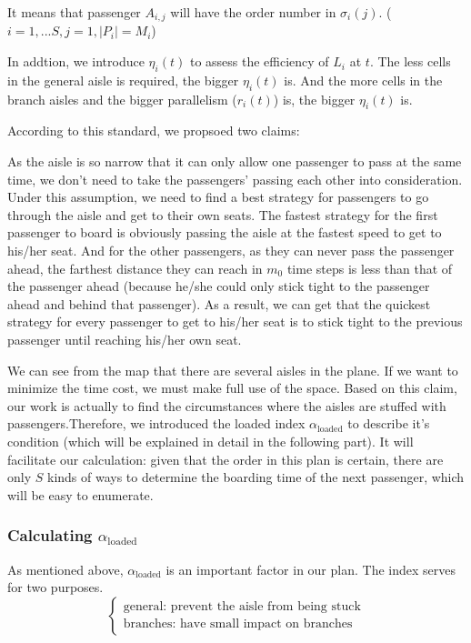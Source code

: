 \documentclass{article}
\theoremstyle{definition}
\theoremstyle{remark}
\numberwithin{equation}{section}
\begin{document}
	It means that passenger $A_{i,j}$ will have the order number in $\sigma_i (j)$. ($i=1,...S, j=1, \left|P_i \right|=M_i$)

	In addtion, we introduce $\eta_i (t)$ to assess the efficiency of $L_i$ at $t$. The less cells in the general aisle is required, the bigger $\eta_i (t)$ is. And the more cells in the branch aisles and the bigger parallelism ($r_i (t)$) is, the bigger $\eta_i (t)$ is.

	According to this standard, we propsoed two claims:
	\begin{enumerate}
		
		As the aisle is so narrow that it can only allow one passenger to pass at the same time, we don't need to take the passengers' passing each other into consideration. Under this assumption, we need to find a best strategy for passengers to go through the aisle and get to their own seats. The fastest strategy for the first passenger to board is obviously passing the aisle at the fastest speed to get to his/her seat. And for the other passengers, as they can never pass the passenger ahead, the farthest distance they can reach in $m_0$ time steps is less than that of the passenger ahead (because he/she could only stick tight to the passenger ahead and behind that passenger). As a result, we can get that the quickest strategy for every passenger to get to his/her seat is to stick tight to the previous passenger until reaching his/her own seat.
		
		We can see from the map that there are several aisles in the plane. If we want to minimize the time cost, we must make full use of the space. Based on this claim, our work is actually to find the circumstances where the aisles are stuffed with passengers.Therefore, we introduced the loaded index $\alpha_\text{loaded}$ to describe it's condition (which will be explained in detail in the following part). It will facilitate our calculation: given that the order in this plan is certain, there are only $S$ kinds of ways to determine the boarding time of the next passenger, which will be easy to enumerate.
	\end{enumerate}
	\subsubsection{ Calculating \(\alpha_\text{loaded}\)}
	As mentioned above, $\alpha_\text{loaded}$ is an important factor in our plan. The index serves for two purposes.
	$$
	\begin{cases}
		\text{general: prevent the aisle from being stuck}\\
		\text{branches: have small impact on branches}
	\end{cases}
	$$
\end{document}
